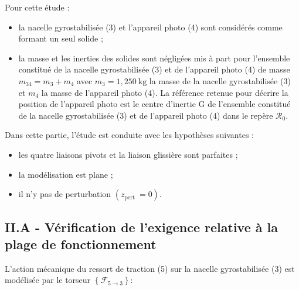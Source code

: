 Pour cette étude :

\begin{itemize}
  \item la nacelle gyrostabilisée (3) et l'appareil photo (4) sont considérés comme formant un seul solide ;
  \item la masse et les inerties des solides sont négligées mis à part pour l'ensemble constitué de la nacelle gyrostabilisée (3) et de l'appareil photo (4) de masse $m_{34}=m_{3}+m_{4}$ avec $m_{3}=1,250 \mathrm{~kg}$ la masse de la nacelle gyrostabilisée (3) et $m_{4}$ la masse de l'appareil photo (4). La référence retenue pour décrire la position de l'appareil photo est le centre d'inertie $\mathrm{G}$ de l'ensemble constitué de la nacelle gyrostabilisée (3) et de l'appareil photo (4) dans le repère $\mathcal{R}_{0}$.

\end{itemize}


Dans cette partie, l'étude est conduite avec les hypothèses suivantes :
\begin{itemize}
  \item les quatre liaisons pivots et la liaison glissière sont parfaites ;
  \item la modélisation est plane ;
  \item il n'y pas de perturbation $\left(z_{\text {pert }}=0\right)$.
\end{itemize}

\ifprof
\begin{corrige}
\end{corrige}
\else
\fi

\ifprof
\begin{corrige}
\end{corrige}
\else
\fi

\ifprof
\begin{corrige}
\end{corrige}
\else
\fi

\subsection{II.A - Vérification de l'exigence relative à la plage de fonctionnement}
L'action mécanique du ressort de traction (5) sur la nacelle gyrostabilisée (3) est modélisée par le torseur $\left\{\mathcal{F}_{5 \rightarrow 3}\right\}:$

